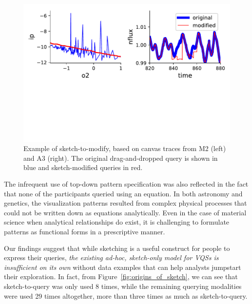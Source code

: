  \begin{figure}[h!]
     \centering
     \includegraphics[width=0.8\columnwidth]{figures/QueryModificationBySketch.pdf}
     \caption{Example of sketch-to-modify, based on canvas traces from M2 (left) and A3 (right). The original drag-and-dropped query is shown in blue and sketch-modified queries in red.}%
     \label{query_modification}
     \vspace{-10pt}
 \end{figure}
 \par The infrequent use of top-down pattern
 specification was also reflected in the fact
 that none of the participants queried using an equation.
 In both astronomy and genetics, the visualization patterns
 resulted from complex physical processes
 that could not be written down as equations analytically.
 Even in the case of material science when analytical
 relationships do exist, it is challenging to formulate patterns as functional forms in a prescriptive manner.
 \par Our findings suggest that while sketching
 is a useful construct for people to express their queries,
 \emph{the existing ad-hoc, sketch-only model for VQSs
 is insufficient on its own} without data examples
 that can help analysts jumpstart their exploration.
 In fact, from Figure~\ref{fig:origins_of_sketch},
 we can see that sketch-to-query was only used
 8 times, while the remaining querying modalities were used 29 times altogether,
 more than three times as much as sketch-to-query.
